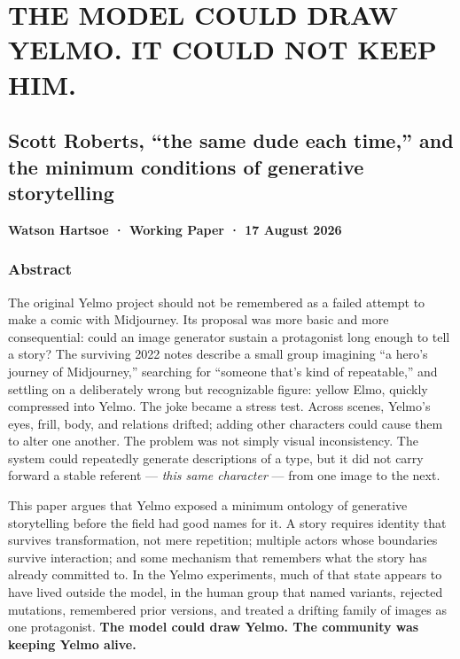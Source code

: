 \documentclass[
]{article}
\author{}
\date{}
\begin{document}
\section{THE MODEL COULD DRAW YELMO. IT COULD NOT KEEP
HIM.}\label{the-model-could-draw-yelmo.-it-could-not-keep-him.}

\subsection{Scott Roberts, ``the same dude each time,'' and the minimum
conditions of generative
storytelling}\label{scott-roberts-the-same-dude-each-time-and-the-minimum-conditions-of-generative-storytelling}

\textbf{Watson Hartsoe · Working Paper · 17 August 2026}

\subsubsection{Abstract}\label{abstract}

The original Yelmo project should not be remembered as a failed attempt
to make a comic with Midjourney. Its proposal was more basic and more
consequential: could an image generator sustain a protagonist long
enough to tell a story? The surviving 2022 notes describe a small group
imagining ``a hero's journey of Midjourney,'' searching for ``someone
that's kind of repeatable,'' and settling on a deliberately wrong but
recognizable figure: yellow Elmo, quickly compressed into Yelmo. The
joke became a stress test. Across scenes, Yelmo's eyes, frill, body, and
relations drifted; adding other characters could cause them to alter one
another. The problem was not simply visual inconsistency. The system
could repeatedly generate descriptions of a type, but it did not carry
forward a stable referent --- \emph{this same character} --- from one
image to the next.

This paper argues that Yelmo exposed a minimum ontology of generative
storytelling before the field had good names for it. A story requires
identity that survives transformation, not mere repetition; multiple
actors whose boundaries survive interaction; and some mechanism that
remembers what the story has already committed to. In the Yelmo
experiments, much of that state appears to have lived outside the model,
in the human group that named variants, rejected mutations, remembered
prior versions, and treated a drifting family of images as one
protagonist. \textbf{The model could draw Yelmo. The community was
keeping Yelmo alive.}
\end{document}
